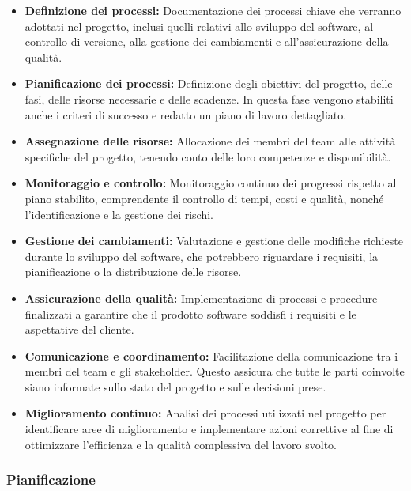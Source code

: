 \begin{itemize}
    \item \textbf{Definizione dei processi:} Documentazione dei processi chiave che verranno adottati nel progetto, inclusi quelli relativi allo sviluppo del software, al controllo di versione, alla gestione dei cambiamenti e all'assicurazione della qualità.
    
    \item \textbf{Pianificazione dei processi:} Definizione degli obiettivi del progetto, delle fasi, delle risorse necessarie e delle scadenze. In questa fase vengono stabiliti anche i criteri di successo e redatto un piano di lavoro dettagliato.
    
    \item \textbf{Assegnazione delle risorse:} Allocazione dei membri del team alle attività specifiche del progetto, tenendo conto delle loro competenze e disponibilità.
    
    \item \textbf{Monitoraggio e controllo:} Monitoraggio continuo dei progressi rispetto al piano stabilito, comprendente il controllo di tempi, costi e qualità, nonché l'identificazione e la gestione dei rischi.
    
    \item \textbf{Gestione dei cambiamenti:} Valutazione e gestione delle modifiche richieste durante lo sviluppo del software, che potrebbero riguardare i requisiti, la pianificazione o la distribuzione delle risorse.
    
    \item \textbf{Assicurazione della qualità:} Implementazione di processi e procedure finalizzati a garantire che il prodotto software soddisfi i requisiti e le aspettative del cliente.
    
    \item \textbf{Comunicazione e coordinamento:} Facilitazione della comunicazione tra i membri del team e gli stakeholder. Questo assicura che tutte le parti coinvolte siano informate sullo stato del progetto e sulle decisioni prese.
    
    \item \textbf{Miglioramento continuo:} Analisi dei processi utilizzati nel progetto per identificare aree di miglioramento e implementare azioni correttive al fine di ottimizzare l’efficienza e la qualità complessiva del lavoro svolto.
\end{itemize}


\subsubsection{Pianificazione}

